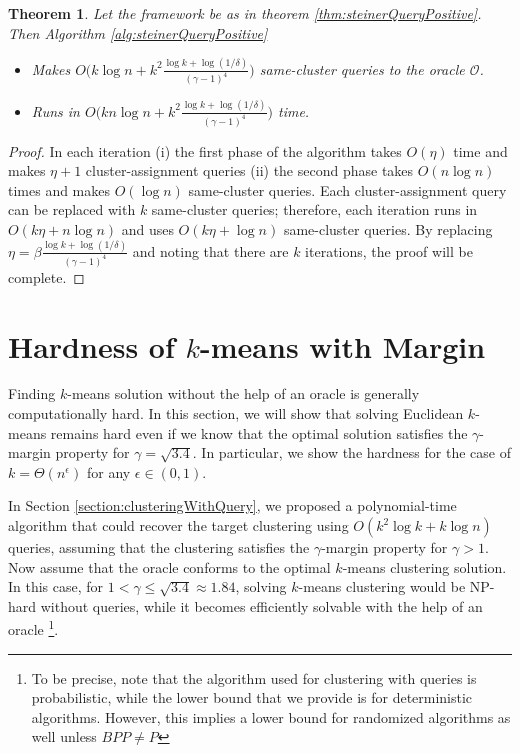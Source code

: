 \documentclass[12pt]{article}
\newcommand{\mc}{\mathcal}
\newtheorem{theorem}{Theorem}
\begin{document}
\begin{theorem}
\label{thm:steinerQueryPositiveComplexity}
Let the framework be as in theorem \ref{thm:steinerQueryPositive}. Then Algorithm \ref{alg:steinerQueryPositive} 
\begin{itemize}[nolistsep,noitemsep]
\item Makes $O\big(k\log n + k^2\frac{\log k + \log (1/\delta)}{(\gamma - 1)^4}\big)$ same-cluster queries to the oracle $\mc O$.
\item Runs in $O\big(kn\log n + k^2\frac{\log k + \log (1/\delta)}{(\gamma - 1)^4}\big)$ time.
\end{itemize}
\end{theorem}

\begin{proof}
In each iteration (i) the first phase of the algorithm takes $O(\eta)$ time and makes $\eta+1$ cluster-assignment queries (ii) the second phase takes $O(n\log n)$ times and makes $O(\log n)$ same-cluster queries. Each cluster-assignment query can be replaced with $k$ same-cluster queries; therefore, each iteration runs in $O(k\eta + n\log n)$ and uses $O(k\eta + \log n)$ same-cluster queries. By replacing $\eta = \beta\frac{\log k + \log(1/\delta)}{(\gamma-1)^4}$ and noting that there are $k$ iterations, the proof will be complete.
\end{proof}

\section{Hardness of $k$-means with Margin}
\label{section:lowerBounds}

Finding $k$-means solution without the help of an oracle is generally computationally hard. In this section, we will show that solving Euclidean $k$-means remains hard even if we know that the optimal solution satisfies the $\gamma$-margin property for $\gamma=\sqrt{3.4}$. In particular, we show the hardness for the case of $k=\Theta(n^\epsilon)$ for any $\epsilon\in (0,1)$.


In Section \ref{section:clusteringWithQuery}, we proposed a polynomial-time algorithm that could recover the target clustering using $O(k^2\log k +k\log n)$ queries, assuming that the clustering satisfies the $\gamma$-margin property for $\gamma>1$. Now assume that the oracle conforms to the optimal $k$-means clustering solution. In this case, for $1<\gamma\le \sqrt{3.4} \approx 1.84$, solving $k$-means clustering would be NP-hard without queries, while it becomes efficiently solvable with the help of an oracle \footnote{To be precise, note that the algorithm used for clustering with queries is probabilistic, while the lower bound that we provide is for deterministic algorithms. However, this implies a lower bound for randomized algorithms as well unless $BPP\neq P$}. 
\end{document}
